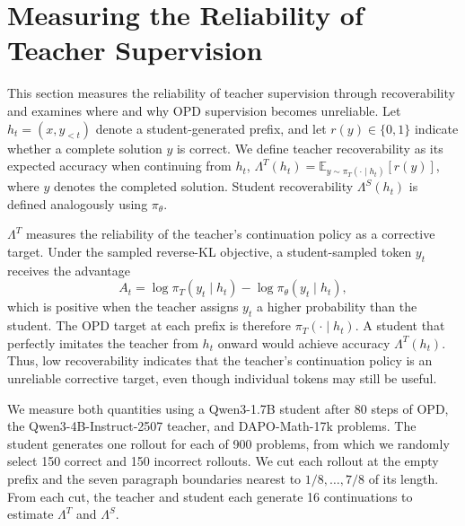 
\section{Measuring the Reliability of Teacher Supervision}
\label{sec:diagnosis}

This section measures the reliability of teacher supervision through recoverability and examines where and why OPD supervision becomes unreliable. Let $h_t=(x,y_{<t})$ denote a student-generated prefix, and let $r(y)\in\{0,1\}$ indicate whether a complete solution $y$ is correct. We define teacher recoverability as its expected accuracy when continuing from $h_t$,
$\Lambda^T(h_t)=\mathbb{E}_{y\sim\pi_T(\cdot\mid h_t)}[r(y)]$,
where $y$ denotes the completed solution. Student recoverability $\Lambda^S(h_t)$ is defined analogously using $\pi_\theta$.

$\Lambda^T$ measures the reliability of the teacher's continuation policy as a corrective target. Under the sampled reverse-KL objective, a student-sampled token $y_t$ receives the advantage
\setlength{\abovedisplayskip}{3pt}\setlength{\belowdisplayskip}{3pt}%
\begin{equation}
A_t = \log \pi_T(y_t \mid h_t)
    - \log \pi_\theta(y_t \mid h_t),
\label{eq:adv}
\end{equation}
which is positive when the teacher assigns $y_t$ a higher probability than the student. The OPD target at each prefix is therefore $\pi_T(\cdot\mid h_t)$. A student that perfectly imitates the teacher from $h_t$ onward would achieve accuracy $\Lambda^T(h_t)$. Thus, low recoverability indicates that the teacher's continuation policy is an unreliable corrective target, even though individual tokens may still be useful.

We measure both quantities using a Qwen3-1.7B student after 80 steps of OPD, the Qwen3-4B-Instruct-2507 teacher, and DAPO-Math-17k problems. The student generates one rollout for each of 900 problems, from which we randomly select 150 correct and 150 incorrect rollouts. We cut each rollout at the empty prefix and the seven paragraph boundaries nearest to $1/8,\ldots,7/8$ of its length. From each cut, the teacher and student each generate 16 continuations to estimate $\Lambda^T$ and $\Lambda^S$.

